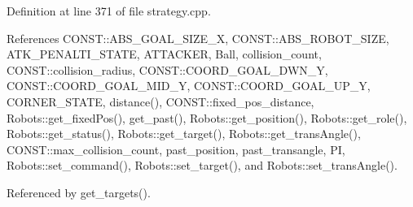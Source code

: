 Definition at line 371 of file strategy.\+cpp.



References C\+O\+N\+S\+T\+::\+A\+B\+S\+\_\+\+G\+O\+A\+L\+\_\+\+S\+I\+Z\+E\+\_\+X, C\+O\+N\+S\+T\+::\+A\+B\+S\+\_\+\+R\+O\+B\+O\+T\+\_\+\+S\+I\+ZE, A\+T\+K\+\_\+\+P\+E\+N\+A\+L\+T\+I\+\_\+\+S\+T\+A\+TE, A\+T\+T\+A\+C\+K\+ER, Ball, collision\+\_\+count, C\+O\+N\+S\+T\+::collision\+\_\+radius, C\+O\+N\+S\+T\+::\+C\+O\+O\+R\+D\+\_\+\+G\+O\+A\+L\+\_\+\+D\+W\+N\+\_\+Y, C\+O\+N\+S\+T\+::\+C\+O\+O\+R\+D\+\_\+\+G\+O\+A\+L\+\_\+\+M\+I\+D\+\_\+Y, C\+O\+N\+S\+T\+::\+C\+O\+O\+R\+D\+\_\+\+G\+O\+A\+L\+\_\+\+U\+P\+\_\+Y, C\+O\+R\+N\+E\+R\+\_\+\+S\+T\+A\+TE, distance(), C\+O\+N\+S\+T\+::fixed\+\_\+pos\+\_\+distance, Robots\+::get\+\_\+fixed\+Pos(), get\+\_\+past(), Robots\+::get\+\_\+position(), Robots\+::get\+\_\+role(), Robots\+::get\+\_\+status(), Robots\+::get\+\_\+target(), Robots\+::get\+\_\+trans\+Angle(), C\+O\+N\+S\+T\+::max\+\_\+collision\+\_\+count, past\+\_\+position, past\+\_\+transangle, PI, Robots\+::set\+\_\+command(), Robots\+::set\+\_\+target(), and Robots\+::set\+\_\+trans\+Angle().



Referenced by get\+\_\+targets().


